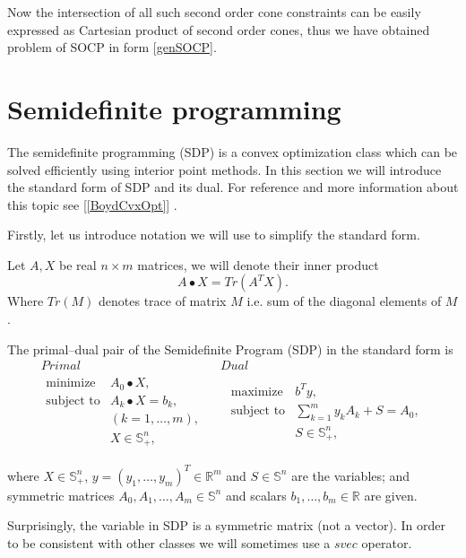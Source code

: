 \documentclass[12pt]{book}
\theoremstyle{definition}
\begin{document}
Now the intersection of all such second order cone constraints can be easily expressed as Cartesian product of second order cones, thus we have obtained problem of SOCP in form \ref{genSOCP}. 


\section{Semidefinite programming}




The semidefinite programming (SDP) is a convex optimization class which can be solved efficiently using interior point methods. In this section we will introduce the standard form of SDP and its dual. For reference and more information about this topic see [\ref{BoydCvxOpt}] .


Firstly, let us introduce notation we will use to simplify the standard form.

\label{defBullet}
Let $A,X$ be real $n\times m$ matrices, we will denote their inner product 
$$A\bullet X = Tr(A^TX).$$
Where $Tr(M)$ denotes trace of matrix $M$ i.e. sum of the diagonal elements of $M$.

\label{defSDP}
The primal--dual pair of the Semidefinite Program (SDP) in the standard form is
\begin{equation}
\label{sdp} 
\begin{array}{cc}
Primal & Dual \\
\begin{array}{ll}
\mbox{minimize} & A_0\bullet X,\\
\mbox{subject to}& A_k\bullet X  = b_k, \ \\
 & ( k = 1,\dots ,m), \\
& X \in \mathbb{S}^n_+,
\end{array}
\ \  &  \ \
\begin{array}{ll}
\mbox{maximize} & b^Ty, \\
\mbox{subject to}& \sum_{k=1}^m y_kA_k + S  = A_0 ,\\
& S \in \mathbb{S}^n_+,
\end{array}
\end{array}
\end{equation}

where $X\in \mathbb{S}^n_+$, $y = (y_1,\dots ,y_m)^T\in \mathbb{R}^m$ and $S\in \mathbb{S}^n$ are the variables; and symmetric matrices $A_0 , A_1,\dots , A_m \in \mathbb{S}^n$ and scalars $b_1,\dots, b_m \in \mathbb{R}$ are given.


Surprisingly, the variable in SDP is a symmetric matrix (not a vector). 
In order to be consistent with other classes we will sometimes use a $svec$ operator.  
\end{document}

